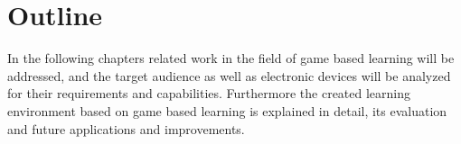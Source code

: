 \section{Outline}\label{sec:outlook}
In the following chapters related work in the field of game based learning will be addressed,
and the target audience as well as electronic devices will be analyzed for their requirements and capabilities.
Furthermore the created learning environment based on game based learning is explained in detail, its evaluation and
future applications and improvements.
